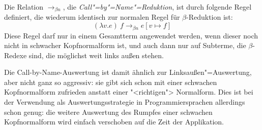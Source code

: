 \begin{definition}
  Die Relation $\rightarrow_{\beta n}$, die
  \textit{Call"=by"=Name"=Reduktion}, ist durch folgende Regel
  definiert,
  die wiederum identisch zur normalen Regel für $\beta$-Reduktion ist:
  \begin{displaymath}
    (\lambda v.e)~f \rightarrow_{\beta n} e[v\mapsto f]
  \end{displaymath}
  Diese Regel darf nur in einem Gesamtterm angewendet werden,
  wenn dieser noch nicht in schwacher Kopfnormalform ist, und auch dann
  nur auf Subterme, die $\beta$-Redexe sind, die möglichst weit
  links außen stehen.
\end{definition}
%
Die Call-by-Name-Auswertung ist damit ähnlich zur
Linksaußen"=Auswertung, aber nicht ganz so aggressiv: sie gibt sich
schon mit einer schwachen Kopfnormalform zufrieden anstatt einer
"<richtigen"> Normalform.  Dies ist bei der Verwendung als
Auswertungsstrategie in Programmiersprachen allerdings schon
genug: die weitere Auswertung des Rumpfes einer schwachen
Kopfnormalform wird einfach verschoben auf die Zeit der Applikation.

